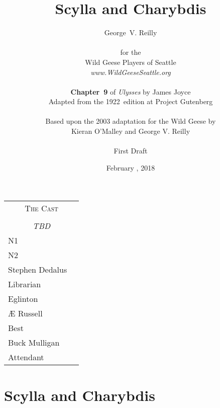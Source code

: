 


\title{\Huge Scylla and Charybdis}
\author{George~V. Reilly\\
\\
{\small for the}\\
Wild Geese Players of Seattle\\
{\textit{www.WildGeeseSeattle.org}}\\
\\
{\small \textbf{Chapter~9} of \textit{Ulysses} by James Joyce}\\
{\small Adapted from the 1922~edition at Project Gutenberg}
\\
\\
{\small Based upon the 2003 adaptation for the Wild Geese by}\\
{\small Kieran O'Malley and George V. Reilly}\\
\\
{\small First Draft}}
\date{February , 2018}
\raggedbottom



\maketitle
\thispagestyle{empty}
\pagebreak

\begin{tabular}{lp{10cm}}
    \multicolumn{2}{c}{\Large \textsc{The Cast}} \\
\\
    \multicolumn{2}{c}{\large \textit{TBD}} \\
N1 \\  %
N2 \\  %
Stephen Dedalus \\
Librarian \\
Eglinton \\
Æ Russell \\
Best \\
Buck Mulligan \\
Attendant \\
\end{tabular}

\thispagestyle{empty}
\newpage


\setcounter{page}{1}

\section*{Scylla and Charybdis}




